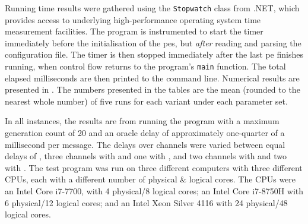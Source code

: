 Running time results were gathered using the \texttt{Stopwatch} class from .NET, which provides access to underlying high-performance operating system time measurement facilities.  The program is instrumented to start the timer immediately before the initialisation of the \glspl{pe}, but \emph{after} reading and parsing the configuration file.  The timer is then stopped immediately after the last \gls{pe} finishes running, when control flow returns to the program's \texttt{main} function.  The total elapsed milliseconds are then printed to the command line.  Numerical results are presented in .  The numbers presented in the tables are the mean (rounded to the nearest whole number) of five runs for each variant under each parameter set.

In all instances, the results are from running the program with a maximum generation count of 20 and an oracle delay of approximately one-quarter of a millisecond per message.  The delays over channels were varied between equal delays of , three channels with  and one with , and two channels with  and two with .  The test program was run on three different computers with three different CPUs, each with a different number of physical \& logical cores.  The CPUs were an Intel\textsuperscript{\textregistered} Core\textsuperscript{\texttrademark} i7-7700, with 4 physical/8 logical cores; an Intel\textsuperscript{\textregistered} Core\textsuperscript{\texttrademark} i7-8750H with 6 physical/12 logical cores; and an Intel\textsuperscript{\textregistered} Xeon\textsuperscript{\textregistered} Silver 4116 with 24 physical/48 logical cores.

